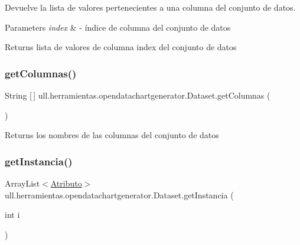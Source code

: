 Devuelve la lista de valores pertenecientes a una columna del conjunto de datos. 


\begin{DoxyParams}{Parameters}
{\em index} & -\/ índice de columna del conjunto de datos \\
\hline
\end{DoxyParams}
\begin{DoxyReturn}{Returns}
lista de valores de columna index del conjunto de datos 
\end{DoxyReturn}
\mbox{\label{classull_1_1herramientas_1_1opendatachartgenerator_1_1_dataset_af9ee7ea6ec6e21192d958d01c97af701}} 
\subsubsection{\texorpdfstring{get\+Columnas()}{getColumnas()}}
{\footnotesize\ttfamily String \mbox{[}$\,$\mbox{]} ull.\+herramientas.\+opendatachartgenerator.\+Dataset.\+get\+Columnas (\begin{DoxyParamCaption}{ }\end{DoxyParamCaption})}

\begin{DoxyReturn}{Returns}
los nombres de las columnas del conjunto de datos 
\end{DoxyReturn}
\mbox{\label{classull_1_1herramientas_1_1opendatachartgenerator_1_1_dataset_a696a9dfd92ba71e8fe28d3c6cb7de05a}} 
\subsubsection{\texorpdfstring{get\+Instancia()}{getInstancia()}}
{\footnotesize\ttfamily Array\+List$<$\mbox{\hyperlink{classull_1_1herramientas_1_1opendatachartgenerator_1_1_atributo}{Atributo}}$>$ ull.\+herramientas.\+opendatachartgenerator.\+Dataset.\+get\+Instancia (\begin{DoxyParamCaption}\item[{int}]{i }\end{DoxyParamCaption})}



